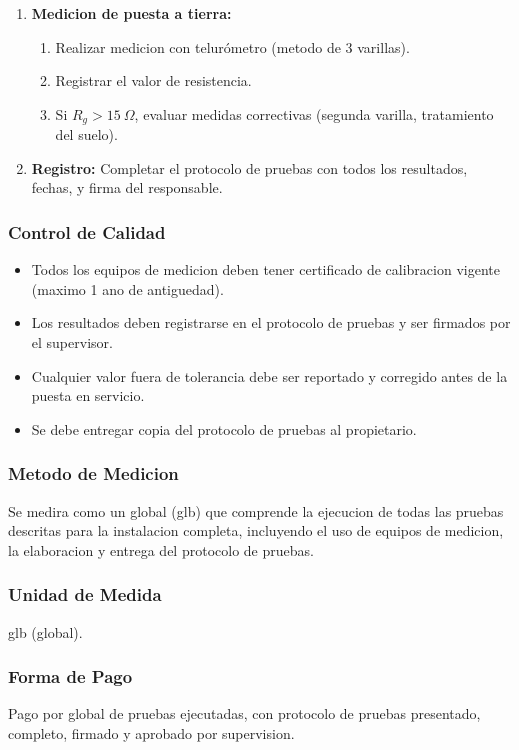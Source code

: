 \begin{enumerate}
\begin{enumerate}
    \item Verificar que dispare inmediatamente (debe cortar el suministro en menos de 40 ms).
    \item Presionar RESET para restablecer.
    \item Si se dispone de RCD tester, medir el tiempo de disparo real.
  \end{enumerate}
  \item \textbf{Medicion de puesta a tierra:}
  \begin{enumerate}
    \item Realizar medicion con telurómetro (metodo de 3 varillas).
    \item Registrar el valor de resistencia.
    \item Si $R_g > 15\ \Omega$, evaluar medidas correctivas (segunda varilla, tratamiento del suelo).
  \end{enumerate}
  \item \textbf{Registro:} Completar el protocolo de pruebas con todos los resultados, fechas, y firma del responsable.
\end{enumerate}

\subsubsection{Control de Calidad}

\begin{itemize}
  \item Todos los equipos de medicion deben tener certificado de calibracion vigente (maximo 1 ano de antiguedad).
  \item Los resultados deben registrarse en el protocolo de pruebas y ser firmados por el supervisor.
  \item Cualquier valor fuera de tolerancia debe ser reportado y corregido antes de la puesta en servicio.
  \item Se debe entregar copia del protocolo de pruebas al propietario.
\end{itemize}

\subsubsection{Metodo de Medicion}

Se medira como un global (glb) que comprende la ejecucion de todas las pruebas descritas para la instalacion completa, incluyendo el uso de equipos de medicion, la elaboracion y entrega del protocolo de pruebas.

\subsubsection{Unidad de Medida}

glb (global).

\subsubsection{Forma de Pago}

Pago por global de pruebas ejecutadas, con protocolo de pruebas presentado, completo, firmado y aprobado por supervision.
